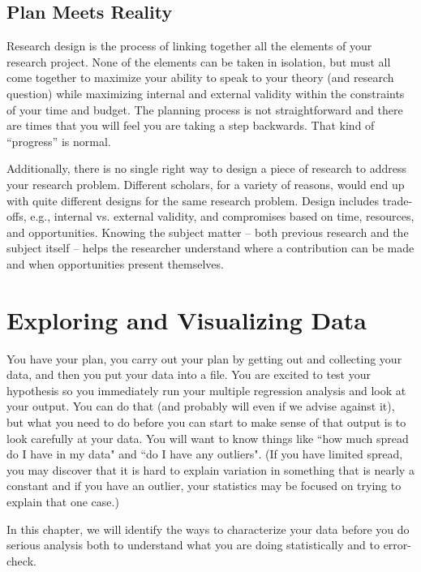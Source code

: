 \documentclass[11pt,openany]{book}\usepackage[]{graphicx}\usepackage[]{color}
\begin{document}
\section{Plan Meets Reality}

Research design is the process of linking together all the elements of your research project. None of the elements can be taken in isolation, but must all come together to maximize your ability to speak to your theory (and research question) while maximizing internal and external validity within the constraints of your time and budget. The planning process is not straightforward and there are times that you will feel you are taking a step backwards. That kind of ``progress'' is normal. 
	
Additionally, there is no single right way to design a piece of research to address your research problem. Different scholars, for a variety of reasons, would end up with quite different designs for the same research problem. Design includes trade-offs, e.g., internal vs. external validity, and compromises based on time, resources, and opportunities. Knowing the subject matter -- both previous research and the subject itself -- helps the researcher understand where a contribution can be made and when opportunities present themselves.




\chapter{Exploring and Visualizing Data}

You have your plan, you carry out your plan by getting out and collecting your data, and then you put your data into a file.  You are excited to test your hypothesis so you immediately run your multiple regression analysis and look at your output.  You can do that (and probably will even if we advise against it), but what you need to do before you can start to make sense of that output is to look carefully at your data.  You will want to know things like ``how much spread do I have in my data" and ``do I have any outliers".  (If you have limited spread, you may discover that it is hard to explain variation in something that is nearly a constant and if you have an outlier, your statistics may be focused on trying to explain that one case.) 

In this chapter, we will identify the ways to characterize your data before you do serious analysis both to understand what you are doing statistically and to error-check.
\end{document}
